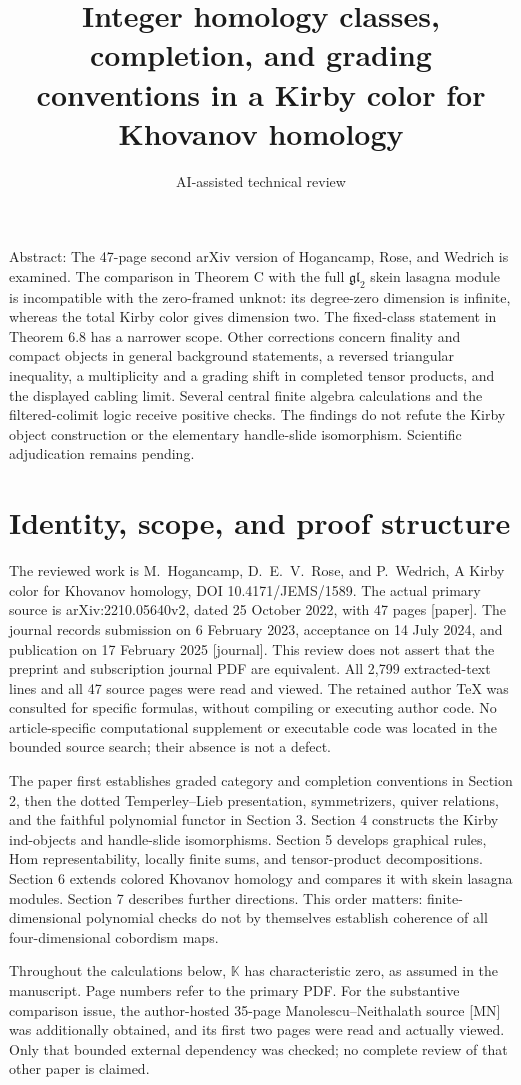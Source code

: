 \documentclass[10pt]{article}
\title{Integer homology classes, completion, and grading conventions in a Kirby color for Khovanov homology}
\author{AI-assisted technical review}
\date{}
\begin{document}
\maketitle
Abstract: The 47-page second arXiv version of Hogancamp, Rose, and Wedrich is examined. The comparison in Theorem C with the full \(\mathfrak{gl}_2\) skein lasagna module is incompatible with the zero-framed unknot: its degree-zero dimension is infinite, whereas the total Kirby color gives dimension two. The fixed-class statement in Theorem 6.8 has a narrower scope. Other corrections concern finality and compact objects in general background statements, a reversed triangular inequality, a multiplicity and a grading shift in completed tensor products, and the displayed cabling limit. Several central finite algebra calculations and the filtered-colimit logic receive positive checks. The findings do not refute the Kirby object construction or the elementary handle-slide isomorphism. Scientific adjudication remains pending.\par
\section*{Identity, scope, and proof structure}
The reviewed work is M. Hogancamp, D. E. V. Rose, and P. Wedrich, A Kirby color for Khovanov homology, DOI 10.4171/JEMS/1589. The actual primary source is arXiv:2210.05640v2, dated 25 October 2022, with 47 pages [paper]. The journal records submission on 6 February 2023, acceptance on 14 July 2024, and publication on 17 February 2025 [journal]. This review does not assert that the preprint and subscription journal PDF are equivalent. All 2,799 extracted-text lines and all 47 source pages were read and viewed. The retained author TeX was consulted for specific formulas, without compiling or executing author code. No article-specific computational supplement or executable code was located in the bounded source search; their absence is not a defect.\par
The paper first establishes graded category and completion conventions in Section 2, then the dotted Temperley–Lieb presentation, symmetrizers, quiver relations, and the faithful polynomial functor in Section 3. Section 4 constructs the Kirby ind-objects and handle-slide isomorphisms. Section 5 develops graphical rules, Hom representability, locally finite sums, and tensor-product decompositions. Section 6 extends colored Khovanov homology and compares it with skein lasagna modules. Section 7 describes further directions. This order matters: finite-dimensional polynomial checks do not by themselves establish coherence of all four-dimensional cobordism maps.\par
Throughout the calculations below, \(\mathbb K\) has characteristic zero, as assumed in the manuscript. Page numbers refer to the primary PDF. For the substantive comparison issue, the author-hosted 35-page Manolescu–Neithalath source [MN] was additionally obtained, and its first two pages were read and actually viewed. Only that bounded external dependency was checked; no complete review of that other paper is claimed.\par
\end{document}

